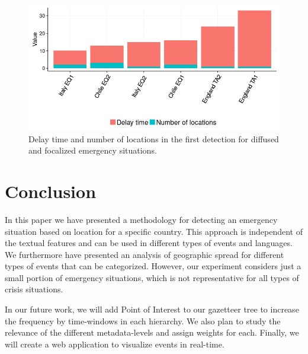 \documentclass{llncs}
\begin{document}
\begin{figure}[h]
	\centering
	\includegraphics[scale=0.5]{img/delay2.png}
	\caption{Delay time and number of locations in the first detection for diffused and focalized emergency situations.}
	\label{fig:delay}
\end{figure}



\section{Conclusion}

In this paper we have presented a methodology for detecting an emergency situation based on location for a specific country. This approach is independent of the textual features and can be used in different types of events and languages. We furthermore have presented an analysis of geographic spread for different types of events that can be categorized. However, our experiment considers just a small portion of emergency situations, which is not representative for all types of crisis situations.

In our future work, we will add Point of Interest to our gazetteer tree to increase the frequency by time-windows in each hierarchy. We also plan to study the relevance of the different metadata-levels and assign weights for each. Finally, we will create a web application to visualize events in real-time.

%


\end{document}

